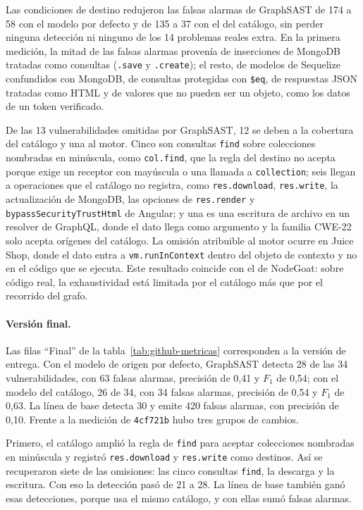 Las condiciones de destino redujeron las falsas alarmas de GraphSAST de
174 a 58 con el modelo por defecto y de 135 a 37 con el del catálogo, sin
perder ninguna detección ni ninguno de los 14 problemas reales extra. En
la primera medición, la mitad de las falsas alarmas provenía de
inserciones de MongoDB tratadas como consultas (\texttt{.save} y
\texttt{.create}); el resto, de modelos de Sequelize confundidos con
MongoDB, de consultas protegidas con \texttt{\$eq}, de respuestas JSON
tratadas como HTML y de valores que no pueden ser un objeto, como los
datos de un token verificado.

De las 13 vulnerabilidades omitidas por GraphSAST, 12 se deben a la
cobertura del catálogo y una al motor. Cinco son consultas \texttt{find}
sobre colecciones nombradas en minúscula, como \texttt{col.find}, que la
regla del destino no acepta porque exige un receptor con mayúscula o una
llamada a \texttt{collection}; seis llegan a operaciones que el catálogo
no registra, como \texttt{res.download}, \texttt{res.write}, la
actualización de MongoDB, las opciones de \texttt{res.render} y
\texttt{bypassSecurityTrustHtml} de Angular; y una es una escritura de
archivo en un resolver de GraphQL, donde el dato llega como argumento y la
familia CWE-22 solo acepta orígenes del catálogo. La omisión atribuible
al motor ocurre en Juice Shop, donde el dato entra a
\texttt{vm.runInContext} dentro del objeto de contexto y no en el código
que se ejecuta. Este resultado coincide con el de NodeGoat: sobre código
real, la exhaustividad está limitada por el catálogo más que por el
recorrido del grafo.

\paragraph{Versión final.} Las filas \enquote{Final} de la
tabla~\ref{tab:github-metricas} corresponden a la versión de entrega. Con
el modelo de origen por defecto, GraphSAST detecta 28 de las 34
vulnerabilidades, con 63 falsas alarmas, precisión de 0,41 y $F_1$ de
0,54; con el modelo del catálogo, 26 de 34, con 34 falsas alarmas,
precisión de 0,54 y $F_1$ de 0,63. La línea de base detecta 30 y emite
420 falsas alarmas, con precisión de 0,10. Frente a la medición de
\texttt{4cf721b} hubo tres grupos de cambios.

Primero, el catálogo amplió la regla de \texttt{find} para aceptar
colecciones nombradas en minúscula y registró \texttt{res.download} y
\texttt{res.write} como destinos. Así se recuperaron siete de las
omisiones: las cinco consultas \texttt{find}, la descarga y la escritura.
Con eso la detección pasó de 21 a 28. La línea de base también ganó esas
detecciones, porque usa el mismo catálogo, y con ellas sumó falsas
alarmas.


